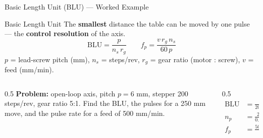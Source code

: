 \documentclass[aspectratio=169]{beamer}
\begin{document}
	\begin{frame}{Basic Length Unit (BLU) --- Worked Example}
		\begin{block}{Basic Length Unit}
			The \textbf{smallest} distance the table can be moved by one pulse --- the \textbf{control resolution} of the axis.
			\[
			\text{BLU} = \frac{p}{n_s\, r_g}
			\qquad
			f_p = \frac{v\, r_g\, n_s}{60\,p}
			\]
			$p$ = lead-screw pitch (mm), $n_s$ = steps/rev, $r_g$ = gear ratio (motor : screw), $v$ = feed (mm/min).
		\end{block}
		\begin{columns}[T]
			\begin{column}{0.5\textwidth}
				\textbf{Problem:} open-loop axis, pitch $p = 6$ mm, stepper 200 steps/rev, gear ratio 5:1.
				Find the BLU, the pulses for a 250 mm move, and the pulse rate for a feed of 500 mm/min.
			\end{column}
			\begin{column}{0.5\textwidth}
				\small
				\begin{align*}
					\text{BLU} &= \tfrac{6}{200\times5} = \boxed{0.006\ \text{mm}}\\
					n_p &= \tfrac{250}{0.006} \approx \boxed{41\,667\ \text{pulses}}\\
					f_p &= \tfrac{500\times5\times200}{60\times6} \approx \boxed{1389\ \text{Hz}}
				\end{align*}
			\end{column}
		\end{columns}
	\end{frame}
\end{document}
